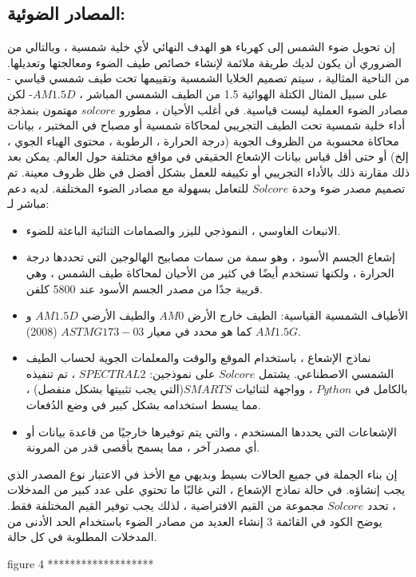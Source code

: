 \subsection{المصادر الضوئية:}
إن تحويل ضوء الشمس إلى كهرباء هو الهدف النهائي لأي خلية شمسية ، وبالتالي من الضروري أن يكون لديك طريقة ملائمة لإنشاء خصائص طيف الضوء ومعالجتها وتعديلها. من الناحية المثالية ، سيتم تصميم الخلايا الشمسية وتقييمها تحت طيف شمسي قياسي - على سبيل المثال الكتلة الهوائية 1.5 من الطيف الشمسي المباشر ، $ AM1.5D  $- لكن مصادر الضوء العملية ليست قياسية. في أغلب الأحيان ، مطورو $ solcore $ مهتمون بنمذجة أداء خلية شمسية تحت الطيف التجريبي لمحاكاة شمسية أو مصباح في المختبر ، بيانات محاكاة محسوبة من الظروف الجوية (درجة الحرارة ، الرطوبة ، محتوى الهباء الجوي ، إلخ) أو حتى أقل قياس بيانات الإشعاع الحقيقي في مواقع مختلفة حول العالم. يمكن بعد ذلك مقارنة ذلك بالأداء التجريبي أو تكييفه للعمل بشكل أفضل في ظل ظروف معينة.
تم تصميم مصدر ضوء وحدة $ Solcore $ للتعامل بسهولة مع مصادر الضوء المختلفة. لديه دعم مباشر لـ:
\begin{itemize}
	\item 
	
	الانبعاث الغاوسي ، النموذجي لليزر والصمامات الثنائية الباعثة للضوء.
	\item 
	إشعاع الجسم الأسود ، وهو سمة من سمات مصابيح الهالوجين التي تحددها درجة الحرارة ، ولكنها تستخدم أيضًا في كثير من الأحيان لمحاكاة طيف الشمس ، وهي قريبة جدًا من مصدر الجسم الأسود عند 5800 كلفن.
	\item 
	الأطياف الشمسية القياسية: الطيف خارج الأرض $ AM0 $ والطيف الأرضي $ AM1.5D $ و $ AM1.5G $ كما هو محدد في معيار $ ASTM G173-03 $ (2008).
	\item 
	نماذج الإشعاع ، باستخدام الموقع والوقت والمعلمات الجوية لحساب الطيف الشمسي الاصطناعي. يشتمل $ Solcore $ على نموذجين:
	$ SPECTRAL2 $ ، تم تنفيذه بالكامل في $ Python $ ،
	وواجهة لثنائيات $ SMARTS  $(التي يجب تثبيتها بشكل منفصل) ، مما يبسط استخدامه بشكل كبير في وضع الدُفعات.
	\item 
	الإشعاعات التي يحددها المستخدم ، والتي يتم توفيرها خارجيًا من قاعدة بيانات أو أي مصدر آخر ، مما يسمح بأقصى قدر من المرونة.
\end{itemize}
إن بناء الجملة في جميع الحالات بسيط وبديهي مع الأخذ في الاعتبار نوع المصدر الذي يجب إنشاؤه. في حالة نماذج الإشعاع ، التي غالبًا ما تحتوي على عدد كبير من المدخلات ، تحدد $ Solcore $ مجموعة من القيم الافتراضية ، لذلك يجب توفير القيم المختلفة فقط. يوضح الكود في القائمة 3 إنشاء العديد من مصادر الضوء باستخدام الحد الأدنى من المدخلات المطلوبة في كل حالة.

figure 4 *******************


